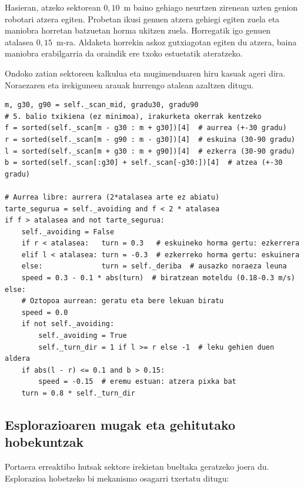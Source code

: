 Hasieran, atzeko sektorean $0{,}10$~m baino gehiago neurtzen zirenean uzten genion robotari atzera egiten. Probetan ikusi genuen atzera gehiegi egiten zuela eta maniobra horretan batzuetan horma ukitzen zuela. Horregatik igo genuen atalasea $0{,}15$~m-ra. Aldaketa horrekin askoz gutxiagotan egiten du atzera, baina maniobra erabilgarria da oraindik ere txoko estuetatik ateratzeko.

Ondoko zatian sektoreen kalkulua eta mugimenduaren hiru kasuak ageri dira. Noraezaren eta irekiguneen arauak hurrengo atalean azaltzen ditugu.

\begin{lstlisting}[caption={LiDAR sektoreak, bi segurtasun-atalaseak eta atzerako bultzada \texttt{rwander.py}-n.},label={lst:rwander}]
m, g30, g90 = self._scan_mid, gradu30, gradu90
# 5. balio txikiena (ez minimoa), irakurketa okerrak kentzeko
f = sorted(self._scan[m - g30 : m + g30])[4]  # aurrea (+-30 gradu)
r = sorted(self._scan[m - g90 : m - g30])[4]  # eskuina (30-90 gradu)
l = sorted(self._scan[m + g30 : m + g90])[4]  # ezkerra (30-90 gradu)
b = sorted(self._scan[:g30] + self._scan[-g30:])[4]  # atzea (+-30 gradu)

# Aurrea libre: aurrera (2*atalasea arte ez abiatu)
tarte_segurua = self._avoiding and f < 2 * atalasea
if f > atalasea and not tarte_segurua:
    self._avoiding = False
    if r < atalasea:   turn = 0.3   # eskuineko horma gertu: ezkerrera
    elif l < atalasea: turn = -0.3  # ezkerreko horma gertu: eskuinera
    else:              turn = self._deriba  # ausazko noraeza leuna
    speed = 0.3 - 0.1 * abs(turn)  # biratzean moteldu (0.18-0.3 m/s)
else:
    # Oztopoa aurrean: geratu eta bere lekuan biratu
    speed = 0.0
    if not self._avoiding:
        self._avoiding = True
        self._turn_dir = 1 if l >= r else -1  # leku gehien duen aldera
    if abs(l - r) <= 0.1 and b > 0.15:
        speed = -0.15  # eremu estuan: atzera pixka bat
    turn = 0.8 * self._turn_dir
\end{lstlisting}

\subsection{Esplorazioaren mugak eta gehitutako hobekuntzak}\label{sec:oz-esplorazioa}

Portaera erreaktibo hutsak sektore irekietan bueltaka geratzeko joera du. Esplorazioa hobetzeko bi mekanismo osagarri txertatu ditugu:

